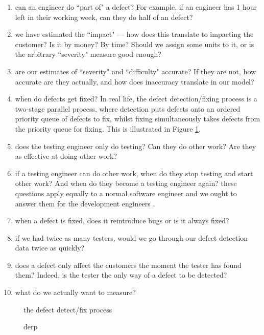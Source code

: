\begin{enumerate}
	\item can an engineer do ``part of" a defect?
	For example, if an engineer has 1 hour left in their working week, can they do half of an \easy
defect? \label{openQuestOne}
	\item we have estimated the ``impact" --- how does this translate to impacting the customer?
	Is it by money?
	By time?
	Should we assign some units to it, or is the arbitrary ``severity" measure good enough?
	\label{openQuestTwo}
	\item are our estimates of ``severity" and ``difficulty" accurate?
	If they are not, how accurate are they actually, and how does inaccuracy translate in our model?
	\label{openQuestThree}
	\item when do defects get fixed?
	In real life, the defect detection/fixing process is a two-stage parallel process, where detection
puts defects onto an ordered priority queue of defects to fix, whilst fixing simultaneously takes
defects from the priority queue for fixing.
	This is illustrated in Figure \ref{realDefectProcess}. \label{openQuestFour}
	\item does the testing engineer only do testing?
	Can they do other work?
	Are they as effective at doing other work? \label{openQuestFive}
	\item if a testing engineer can do other work, when do they stop testing and start other work?
	And when do they become a testing engineer again? these questions apply equally to a normal software engineer and we ought to answer them for
the development engineers \label{openQuestSix}. 
	\item when a defect is fixed, does it reintroduce bugs or is it always fixed?
	\label{openQuestEight}
	\item if we had twice as many testers, would we go through our defect detection data twice as
quickly? \label{openQuestNine}
	\item does a defect only affect the customers the moment the tester has found them?
	Indeed, is the tester the only way of a defect to be detected? \label{openQuestTen}
	\item what do we actually want to measure? \label{openQuestEleven}
\end{enumerate}

\begin{figure}
	\FIXME the defect detect/fix process
	\caption{derp} \label{realDefectProcess}
\end{figure}

